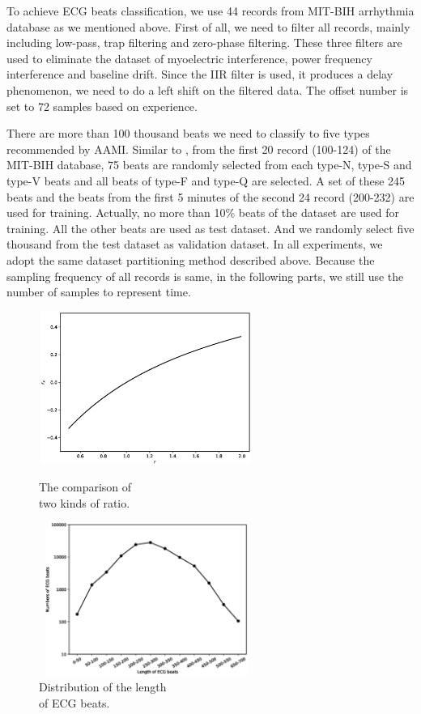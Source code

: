\documentclass[wcp]{jmlr}
\begin{document}
To achieve ECG beats classification, we use 44 records from MIT-BIH arrhythmia database as we mentioned above. First of all, we need to filter all records, mainly including low-pass, trap filtering and zero-phase filtering. These three filters are used to eliminate the dataset of myoelectric interference, power frequency interference and baseline drift. Since the IIR filter is used, it produces a delay phenomenon, we need to do a left shift on the filtered data. The offset number is set to 72 samples based on experience.


There are more than 100 thousand beats we need to classify to five types recommended by AAMI. Similar to \cite{zubair2016automated}, from the first 20 record (100-124) of the MIT-BIH database, 75 beats are randomly selected from each type-N, type-S and type-V beats and all beats of type-F and type-Q are selected. A set of these 245 beats and the beats from the first 5 minutes of the second 24 record (200-232) are used for training. Actually, no more than 10\% beats of the dataset are used for training. All the other beats are used as test dataset. And we randomly select five thousand from the test dataset as validation dataset. In all experiments, we adopt the same dataset partitioning method described above. Because the sampling frequency of all records is same, in the following parts, we still use the number of samples to represent time.
\noindent
\begin{figure}
\begin{center}
\begin{minipage}[c]{0.5\textwidth}
\centering
\includegraphics[angle=0,width=7cm,height=5cm]{gamma.eps}
\centering
\caption{The comparison of \\two kinds of ratio.}
\label{Fig 3}
\end{minipage}%
\begin{minipage}[c]{0.5\textwidth} 
\centering
\includegraphics[angle=0,width=7cm,height=5cm]{distribution_line.eps}
\caption{Distribution of the length \\of ECG beats.}
\label{Fig 6}
\end{minipage}
\end{center}
\end{figure}
\end{document}
